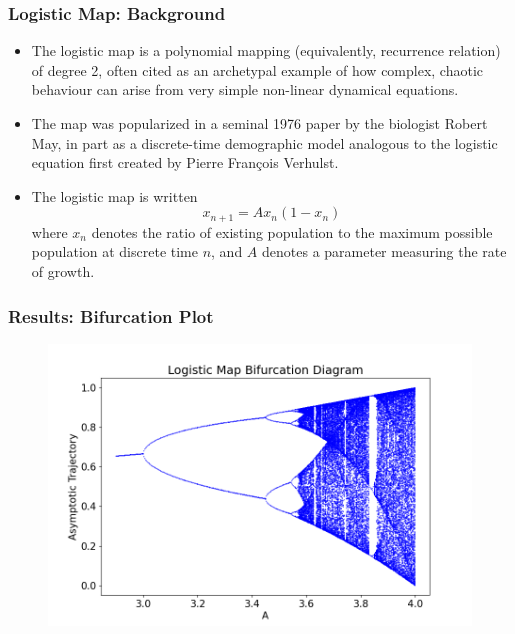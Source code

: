 \documentclass[
	11pt, %
	aspectratio=169, %
]{beamer}
\begin{document}
\begin{frame}
	\frametitle{Logistic Map: Background}
    
        \begin{itemize}
            \item The logistic map is a polynomial mapping (equivalently, recurrence relation) of degree 2, often cited as an archetypal example of how complex, chaotic behaviour can arise from very simple non-linear dynamical equations. \pause
            \item The map was popularized in a seminal 1976 paper by the biologist Robert May, in part as a discrete-time demographic model analogous to the logistic equation first created by Pierre François Verhulst. \pause
            \item The logistic map is written
            \begin{equation}
                x_{n+1} = Ax_n(1-x_n)
            \end{equation}
            where $x_n$ denotes the ratio of existing population to the maximum possible population at discrete time $n$, and $A$ denotes a parameter measuring the rate of growth.
        \end{itemize}

\end{frame}


\begin{frame}
        \frametitle{Results: Bifurcation Plot}
    \begin{figure}
        \includegraphics[width=0.6\linewidth]{logistic_bifurcation_diagram.png}
    \end{figure}
\end{frame}

\end{document}
